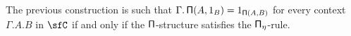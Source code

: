 \begin{rmk}
  The previous construction is such that $\Gamma.\operatorname{\mathsf{\Pi}}(A,1_B)=1_{\operatorname{\mathsf{\Pi}}(A,B)}$ for
  every context $\Gamma.A.B$ in $\sfC$ if and only if the $\operatorname{\mathsf{\Pi}}$-structure
  satisfies the $\operatorname{\mathsf{\Pi}_\eta}$-rule.
\end{rmk}

